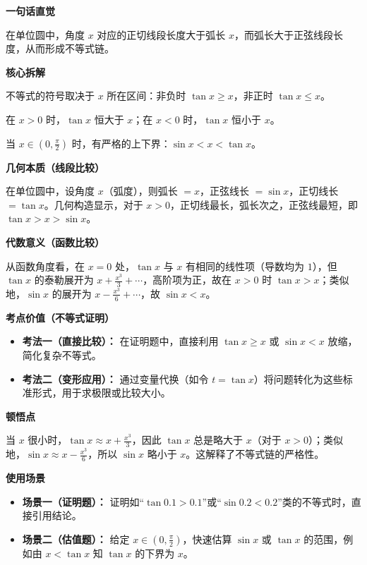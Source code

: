 \begin{explanationbox}
\textbf{\textcolor{CExplanation}{一句话直觉}}

在单位圆中，角度 $x$ 对应的正切线段长度大于弧长 $x$，而弧长大于正弦线段长度，从而形成不等式链。

\medskip
\textbf{\textcolor{CExplanation}{核心拆解}}
\begin{description}[style=nextline, leftmargin=2.8em, labelsep=0.5em, itemsep=0.45em]
    \item[\textbf{要点一（区间分正负）：}] 不等式的符号取决于 $x$ 所在区间：非负时 $\tan x \geq x$，非正时 $\tan x \leq x$。
    \item[\textbf{要点二（不等号方向）：}] 在 $x>0$ 时，$\tan x$ 恒大于 $x$；在 $x<0$ 时，$\tan x$ 恒小于 $x$。
    \item[\textbf{要点三（严格夹逼）：}] 当 $x \in (0,\frac{\pi}{2})$ 时，有严格的上下界：$\sin x < x < \tan x$。
\end{description}

\medskip
\textbf{\textcolor{CExplanation}{几何本质（线段比较）}}

在单位圆中，设角度 $x$（弧度），则弧长 $=x$，正弦线长 $=\sin x$，正切线长 $=\tan x$。几何构造显示，对于 $x>0$，正切线最长，弧长次之，正弦线最短，即 $\tan x > x > \sin x$。

\medskip
\textbf{\textcolor{CExplanation}{代数意义（函数比较）}}

从函数角度看，在 $x=0$ 处，$\tan x$ 与 $x$ 有相同的线性项（导数均为 $1$），但 $\tan x$ 的泰勒展开为 $x + \frac{x^3}{3} + \cdots$，高阶项为正，故在 $x>0$ 时 $\tan x > x$；类似地，$\sin x$ 的展开为 $x - \frac{x^3}{6} + \cdots$，故 $\sin x < x$。

\medskip
\textbf{\textcolor{CExplanation}{考点价值（不等式证明）}}
\begin{itemize}[leftmargin=*, itemsep=0.5em, topsep=0.4em]
    \item \textbf{考法一（直接比较）：} 在证明题中，直接利用 $\tan x \geq x$ 或 $\sin x < x$ 放缩，简化复杂不等式。
    \item \textbf{考法二（变形应用）：} 通过变量代换（如令 $t = \tan x$）将问题转化为这些标准形式，用于求极限或比较大小。
\end{itemize}

\medskip
\textbf{\textcolor{CExplanation}{顿悟点}}

当 $x$ 很小时，$\tan x \approx x + \frac{x^3}{3}$，因此 $\tan x$ 总是略大于 $x$（对于 $x>0$）；类似地，$\sin x \approx x - \frac{x^3}{6}$，所以 $\sin x$ 略小于 $x$。这解释了不等式链的严格性。

\medskip
\textbf{\textcolor{CExplanation}{使用场景}}
\begin{itemize}[leftmargin=*, itemsep=0.5em, topsep=0.4em]
    \item \textbf{场景一（证明题）：} 证明如“$\tan 0.1 > 0.1$”或“$\sin 0.2 < 0.2$”类的不等式时，直接引用结论。
    \item \textbf{场景二（估值题）：} 给定 $x \in (0,\frac{\pi}{2})$，快速估算 $\sin x$ 或 $\tan x$ 的范围，例如由 $x < \tan x$ 知 $\tan x$ 的下界为 $x$。
\end{itemize}
\end{explanationbox}
